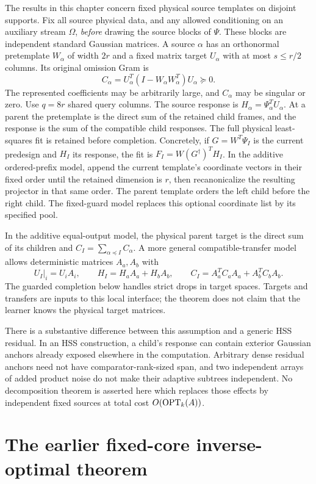 \documentclass[11pt,oneside,openany,a4paper]{report}
\numberwithin{equation}{chapter}
\theoremstyle{definition}
\theoremstyle{remark}
\begin{document}
The results in this chapter concern fixed physical source templates on
disjoint supports.  Fix all source physical data, and any allowed
conditioning on an auxiliary stream $\Omega$, \emph{before} drawing the
source blocks of $\Psi$.  These blocks are independent standard
Gaussian matrices.  A source $\alpha$ has an orthonormal pretemplate
$W_\alpha$ of width $2r$ and a fixed matrix target $U_\alpha$ with at
most $s\leq r/2$ columns.  Its original omission Gram is
\[
 C_\alpha=U_\alpha^T(I-W_\alpha W_\alpha^T)U_\alpha\succeq0.
\]
The represented coefficients may be arbitrarily large, and
$C_\alpha$ may be singular or zero.  Use $q=8r$ shared query columns.
The source response is $H_\alpha=\Psi_\alpha^TU_\alpha$.
At a parent the pretemplate is the direct sum of the retained child
frames, and the response is the sum of the compatible child responses.
The full physical least-squares fit is retained before completion.
Concretely, if $G=W^T\Psi_I$ is the current predesign and $H_I$ its
response, the fit is $F_I=W(G^\dagger)^TH_I$.  In the additive
ordered-prefix model, append the current template's coordinate vectors
in their fixed order until the retained dimension is $r$, then
recanonicalize the resulting projector in that same order.  The parent
template orders the left child before the right child.  The fixed-guard
model replaces this optional coordinate list by its specified pool.

In the additive equal-output model, the physical parent target is the
direct sum of its children and
$C_I=\sum_{\alpha\preceq I}C_\alpha$.  A more general compatible-transfer
model allows deterministic matrices $A_a,A_b$ with
\[
 U_I|_i=U_iA_i,\qquad H_I=H_aA_a+H_bA_b,
 \qquad C_I=A_a^TC_aA_a+A_b^TC_bA_b.
\]
The guarded completion below handles strict drops in target spaces.
Targets and transfers are inputs to this local interface; the theorem
does not claim that the learner knows the physical target matrices.

There is a substantive difference between this assumption and a generic
HSS residual.  In an HSS construction, a child's response can contain
exterior Gaussian anchors already exposed elsewhere in the computation.
Arbitrary dense residual anchors need not have comparator-rank-sized
span, and two independent arrays of added product noise do not make
their adaptive subtrees independent.  No decomposition theorem is
asserted here which replaces those effects by independent fixed sources
at total cost $O(\operatorname{OPT}_k(A))$.

\section{The earlier fixed-core inverse-optimal theorem}
\end{document}

